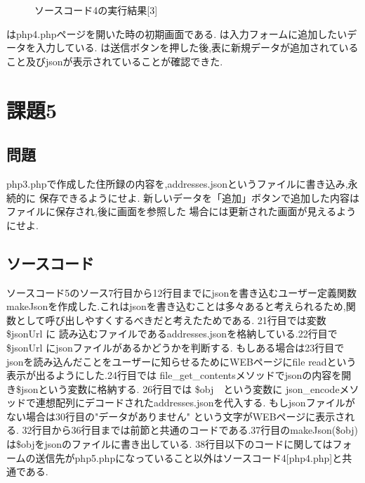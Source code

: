 \documentclass[a4j,10pt]{jsarticle}
\begin{document}
\begin{figure}[H]
  \centering
  \caption{ソースコード4の実行結果[3]}
\label{fig:fig8}
\end{figure}

はphp4.phpページを開いた時の初期画面である.
は入力フォームに追加したいデータを入力している.
は送信ボタンを押した後,表に新規データが追加されていること及びjsonが表示されていることが確認できた.
\section{課題5}

\subsection{問題}

  php3.phpで作成した住所録の内容を,addresses.jsonというファイルに書き込み,永続的に
  保存できるようにせよ.
  新しいデータを「追加」ボタンで追加した内容はファイルに保存され,後に画面を参照した
  場合には更新された画面が見えるようにせよ.

\subsection{ソースコード}

ソースコード5のソース7行目から12行目までにjsonを書き込むユーザー定義関数makeJsonを作成した.これはjsonを書き込むことは多々あると考えられるため,関数として呼び出しやすくするべきだと考えたためである.
21行目では変数 \$jsonUrl に 読み込むファイルであるaddresses.jsonを格納している.22行目で \$jsonUrl にjsonファイルがあるかどうかを判断する.
もしある場合は23行目でjsonを読み込んだことをユーザーに知らせるためにWEBページにfile readという表示が出るようにした.24行目では file\_get\_contentsメソッドでjsonの内容を開き\$jsonという変数に格納する.
26行目では \$obj　という変数に json\_encodeメソッドで連想配列にデコードされたaddresses.jsonを代入する.
もしjsonファイルがない場合は30行目の"データがありません" という文字がWEBページに表示される.
32行目から36行目までは前節と共通のコードである.37行目のmakeJson(\$obj)は\$objをjsonのファイルに書き出している.
38行目以下のコードに関してはフォームの送信先がphp5.phpになっていること以外はソースコード4[php4.php]と共通である.


\end{document}
